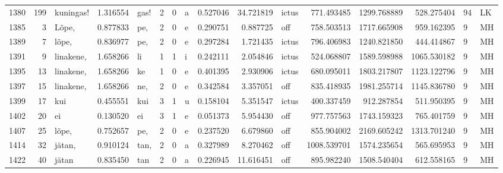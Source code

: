 \begin{tabular}{lrlrllllrrlrrrll}
1380 &         199 &        kuningas! &  1.316554 &    gas! &        2 &      0 &       a &      0.527046 &     34.721819 &  ictus &   771.493485 &  1299.768889 &   528.275404 &     94 &        LK \\
1385 &           3 &            Lõpe, &  0.877833 &     pe, &        2 &      0 &       e &      0.290751 &      0.887725 &    off &   758.503513 &  1717.665908 &   959.162395 &      9 &        MH \\
1389 &           7 &            lõpe, &  0.836977 &     pe, &        2 &      0 &       e &      0.297284 &      1.721435 &  ictus &   796.406983 &  1240.821850 &   444.414867 &      9 &        MH \\
1391 &           9 &        linakene, &  1.658266 &      li &        1 &      1 &       i &      0.242111 &      2.054846 &  ictus &   524.068807 &  1589.598988 &  1065.530182 &      9 &        MH \\
1395 &          13 &        linakene, &  1.658266 &      ke &        1 &      0 &       e &      0.401395 &      2.930906 &  ictus &   680.095011 &  1803.217807 &  1123.122796 &      9 &        MH \\
1397 &          15 &        linakene, &  1.658266 &     ne, &        2 &      0 &       e &      0.342584 &      3.357051 &    off &   835.418935 &  1981.255714 &  1145.836780 &      9 &        MH \\
1399 &          17 &              kui &  0.455551 &     kui &        3 &      1 &       u &      0.158104 &      5.351547 &  ictus &   400.337459 &   912.287854 &   511.950395 &      9 &        MH \\
1402 &          20 &               ei &  0.130520 &      ei &        3 &      1 &       e &      0.051373 &      5.954430 &    off &   977.757563 &  1743.159323 &   765.401759 &      9 &        MH \\
1407 &          25 &            lõpe, &  0.752657 &     pe, &        2 &      0 &       e &      0.237520 &      6.679860 &    off &   855.904002 &  2169.605242 &  1313.701240 &      9 &        MH \\
1414 &          32 &           jätan, &  0.910124 &    tan, &        2 &      0 &       a &      0.327989 &      8.270462 &    off &  1008.539701 &  1574.235654 &   565.695953 &      9 &        MH \\
1422 &          40 &            jätan &  0.835450 &     tan &        2 &      0 &       a &      0.226945 &     11.616451 &    off &   895.982240 &  1508.540404 &   612.558165 &      9 &        MH \\

\end{tabular}
